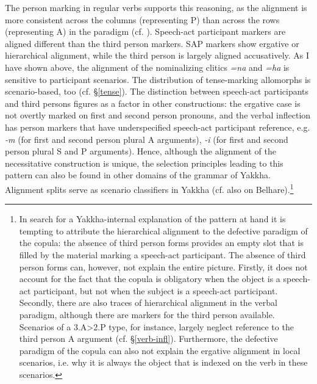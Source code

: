 The  person marking in regular verbs supports this reasoning, as the alignment is more consistent across the columns (representing P) than across the rows (representing A) in the paradigm (cf. \citet{Schackow2012_Grammatical}). Speech-act participant markers are aligned different than the third person markers. SAP markers show ergative or hierarchical alignment, while the third person is largely aligned accusatively. As I have shown above, the alignment of the nominalizing clitics \emph{=na} and \emph{=ha} is sensitive to participant scenarios.  The distribution of tense-marking allomorphs is scenario-based, too (cf. §\ref{tense}).  The distinction between speech-act participants and third persons figures as a factor in other constructions: the ergative case is not overtly marked on first and second person pronouns, and the verbal inflection has person markers that have underspecified speech-act participant reference, e.g. \emph{-m} (for first and second person plural A arguments), \emph{-i} (for first and second person plural S and P arguments). Hence, although the alignment of the necessitative construction is unique, the selection principles leading to this pattern can also be found in other domains of the grammar of Yakkha. Alignment splits serve as scenario classifiers in Yakkha (cf. also \citealt{Bickel1992Motivation} on Belhare).\footnote{In search for a  Yakkha-internal explanation of the pattern at hand it is tempting to attribute the hierarchical alignment to the defective paradigm of the copula: the absence of third person forms provides an empty slot that is filled by the material marking a speech-act participant. The absence of third person forms can, however, not explain the entire picture.  Firstly, it does not account for the fact that the copula is obligatory when the object is a speech-act participant, but not when the subject is a speech-act participant. Secondly, there are also traces of hierarchical alignment in the verbal paradigm, although there are markers for the third person available. Scenarios of a 3.A>2.P type, for instance, largely neglect reference to the third person A argument (cf. §\ref{verb-infl}). Furthermore, the defective paradigm of the copula can also not explain the ergative alignment in local scenarios, i.e. why it is always the object that is indexed on the verb in these scenarios.}


